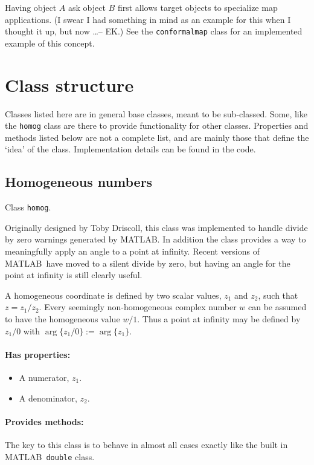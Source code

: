 \documentclass{article}
\newcommand{\code}[1]{\texttt{#1}}
\newcommand{\matlab}{MATLAB}
\begin{document}
Having object $A$ ask object $B$ first allows target objects to specialize map applications. (I swear I had something in mind as an example for this when I thought it up, but now \ldots -- EK.) See the \code{conformalmap} class for an implemented example of this concept.


\section{Class structure}
Classes listed here are in general base classes, meant to be sub-classed. Some, like the \code{homog} class are there to provide functionality for other classes. Properties and methods listed below are not a complete list, and are mainly those that define the `idea' of the class. Implementation details can be found in the code.

\subsection{Homogeneous numbers}
Class \code{homog}.

Originally designed by Toby Driscoll, this class was implemented to handle divide by zero warnings generated by \matlab. In addition the class provides a way to meaningfully apply an angle to a point at infinity. Recent versions of \matlab\ have moved to a silent divide by zero, but having an angle for the point at infinity is still clearly useful.

A homogeneous coordinate is defined by two scalar values, $z_1$ and $z_2$, such that $z = z_1/z_2$. Every seemingly non-homogeneous complex number $w$ can be assumed to have the homogeneous value $w/1$. Thus a point at infinity may be defined by $z_1/0$ with $\arg\{z_1/0\} := \arg\{z_1\}$.

\paragraph{Has properties:}
\begin{itemize}
  \item A numerator, $z_1$.
  \item A denominator, $z_2$.
\end{itemize}

\paragraph{Provides methods:}
The key to this class is to behave in almost all cases exactly like the built in \matlab\ \code{double} class.
\end{document}
